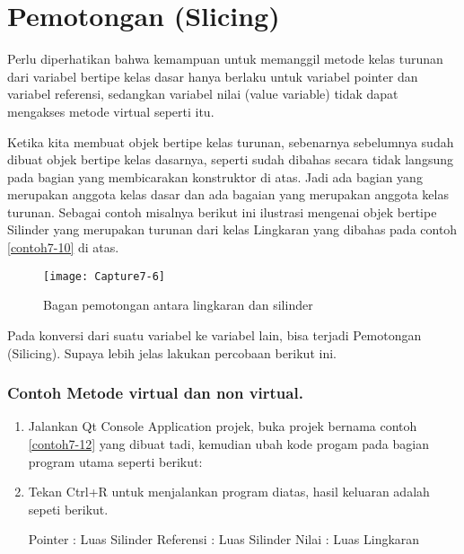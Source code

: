 \section{Pemotongan (Slicing)}\label{pemotongan-slicing}

Perlu diperhatikan bahwa kemampuan untuk memanggil metode kelas turunan
dari variabel bertipe kelas dasar hanya berlaku untuk variabel pointer
dan variabel referensi, sedangkan variabel nilai (value variable) tidak
dapat mengakses metode virtual seperti itu.

Ketika kita membuat objek bertipe kelas turunan, sebenarnya sebelumnya
sudah dibuat objek bertipe kelas dasarnya, seperti sudah dibahas secara
tidak langsung pada bagian yang membicarakan konstruktor di atas. Jadi
ada bagian yang merupakan anggota kelas dasar dan ada bagaian yang
merupakan anggota kelas turunan. Sebagai contoh misalnya berikut ini
ilustrasi mengenai objek bertipe Silinder yang merupakan turunan dari
kelas Lingkaran yang dibahas pada contoh \ref{contoh7-10} di atas.

\begin{figure}[htbp]
\centering
\texttt{[image: Capture7-6]}
\caption{Bagan pemotongan antara lingkaran dan silinder}
\end{figure}

Pada konversi dari suatu variabel ke variabel lain, bisa terjadi
Pemotongan (Silicing). Supaya lebih jelas lakukan percobaan berikut ini.

\subsubsection*{Contoh  Metode virtual dan non virtual.}

\begin{enumerate}

\item Jalankan Qt Console Application projek, buka projek bernama contoh \ref{contoh7-12}
yang dibuat tadi, kemudian ubah kode progam pada bagian program utama
seperti berikut:




\item Tekan Ctrl+R untuk menjalankan program diatas, hasil keluaran adalah
sepeti berikut.

\begin{lcverbatim}
Pointer : Luas Silinder
Referensi : Luas Silinder
Nilai : Luas Lingkaran
\end{lcverbatim}

\end{enumerate}


